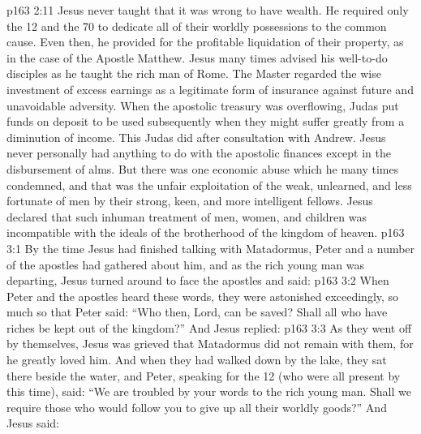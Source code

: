\vs p163 2:11 Jesus never taught that it was wrong to have wealth. He required only the 12 and the 70 to dedicate all of their worldly possessions to the common cause. Even then, he provided for the profitable liquidation of their property, as in the case of the Apostle Matthew. Jesus many times advised his well\hyp{}to\hyp{}do disciples as he taught the rich man of Rome. The Master regarded the wise investment of excess earnings as a legitimate form of insurance against future and unavoidable adversity. When the apostolic treasury was overflowing, Judas put funds on deposit to be used subsequently when they might suffer greatly from a diminution of income. This Judas did after consultation with Andrew. Jesus never personally had anything to do with the apostolic finances except in the disbursement of alms. But there was one economic abuse which he many times condemned, and that was the unfair exploitation of the weak, unlearned, and less fortunate of men by their strong, keen, and more intelligent fellows. Jesus declared that such inhuman treatment of men, women, and children was incompatible with the ideals of the brotherhood of the kingdom of heaven.
\vs p163 3:1 By the time Jesus had finished talking with Matadormus, Peter and a number of the apostles had gathered about him, and as the rich young man was departing, Jesus turned around to face the apostles and said: 
\vs p163 3:2 When Peter and the apostles heard these words, they were astonished exceedingly, so much so that Peter said: “Who then, Lord, can be saved? Shall all who have riches be kept out of the kingdom?” And Jesus replied: 
\vs p163 3:3 As they went off by themselves, Jesus was grieved that Matadormus did not remain with them, for he greatly loved him. And when they had walked down by the lake, they sat there beside the water, and Peter, speaking for the 12 (who were all present by this time), said: “We are troubled by your words to the rich young man. Shall we require those who would follow you to give up all their worldly goods?” And Jesus said: 
